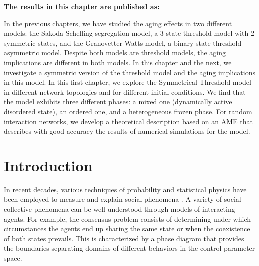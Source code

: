 \vspace{-1.5cm}
\small
\textbf{The results in this chapter are published as:}
\vspace{0.05 cm}

\normalsize
\vspace{0.5 cm}

In the previous chapters, we have studied the aging effects in two different models: the Sakoda-Schelling segregation model, a 3-state threshold model with 2 symmetric states, and the Granovetter-Watts model, a binary-state threshold asymmetric model. Despite both models are threshold models, the aging implications are different in both models. In this chapter and the next, we investigate a symmetric version of the threshold model and the aging implications in this model. In this first chapter, we explore the Symmetrical Threshold model in different network topologies and for different initial conditions. We find that the model exhibits three different phases: a mixed one (dynamically active disordered state), an ordered one, and a heterogeneous frozen phase. For random interaction networks, we develop a theoretical description based on an AME that describes with good accuracy the results of numerical simulations for the model.

\section{\label{sec:Introduction_Schelling} Introduction}

In recent decades, various techniques of probability and statistical physics have been employed to measure and explain social phenomena \cite{castellano2009statistical,jusup2022social,bianconi2023complex}. A variety of social collective phenomena can be well understood through models of interacting agents. For example, the consensus problem consists of determining under which circumstances the agents end up sharing the same state or when the coexistence of both states prevails. This is characterized by a phase diagram that provides the boundaries separating domains of different behaviors in the control parameter space.

